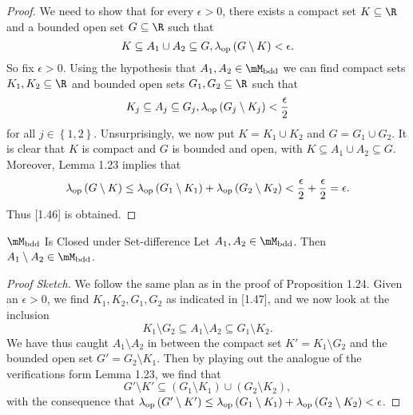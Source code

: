 \documentclass[pmath450]{subfiles}
\begin{document}
    \begin{proof}
        We need to show that for every $\epsilon>0$, there exists a compact set $K\subseteq\R$ and a bounded open set $G\subseteq\R$ such that
        \begin{equation}
            K\subseteq A_1\cup A_2\subseteq G, \lambda_{\operatorname{op}}\left( G\setminus K \right)<\epsilon.
        \end{equation}
        So fix $\epsilon>0$. Using the hypothesis that $A_1,A_2\in\mM_{\bdd}$ we can find compact sets $K_1,K_2\subseteq\R$ and bounded open sets $G_1,G_2\subseteq\R$ such that
        \begin{equation}
            K_j\subseteq A_j\subseteq G_j, \lambda_{\operatorname{op}}\left( G_j\setminus K_j \right)<\frac{\epsilon}{2}
        \end{equation}
        for all $j\in\left\lbrace 1,2 \right\rbrace$. Unsurprisingly, we now put $K=K_1\cup K_2$ and $G=G_1\cup G_2$. It is clear that $K$ is compact and $G$ is bounded and open, with $K\subseteq A_1\cup A_2\subseteq G$. Moreover, Lemma 1.23 implies that
        \begin{equation*}
            \lambda_{\operatorname{op}}\left( G\setminus K \right)\leq\lambda_{\operatorname{op}}\left( G_1\setminus K_1 \right)+\lambda_{\operatorname{op}}\left( G_2\setminus K_2 \right)<\frac{\epsilon}{2}+\frac{\epsilon}{2} = \epsilon.
        \end{equation*}
        Thus [1.46] is obtained.
    \end{proof}

    \begin{prop}{$\mM_{\bdd}$ Is Closed under Set-difference}
        Let $A_1,A_2\in\mM_{\bdd}$. Then $A_1\setminus A_2\in\mM_{\bdd}$.
    \end{prop}

    \begin{proof}[Proof Sketch]
        We follow the same plan as in the proof of Proposition 1.24. Given an $\epsilon>0$, we find $K_1,K_2,G_1,G_2$ as indicated in [1.47], and we now look at the inclusion
        \begin{equation*}
            K_1\setminus G_2\subseteq A_1\setminus A_2\subseteq G_1\setminus K_2.
        \end{equation*}
        We have thus caught $A_1\setminus A_2$ in between the compact set $K'=K_1\setminus G_2$ and the bounded open set $G'=G_2\setminus K_1$. Then by playing out the analogue of the verifications form Lemma 1.23, we find that
        \begin{equation*}
            G'\setminus K'\subseteq\left( G_1\setminus K_1 \right)\cup\left( G_2\setminus K_2 \right),
        \end{equation*}
        with the consequence that $\lambda_{\operatorname{op}}\left( G'\setminus K' \right)\leq\lambda_{\operatorname{op}}\left( G_1\setminus K_1 \right)+\lambda_{\operatorname{op}}\left( G_2\setminus K_2 \right)<\epsilon$.
    \end{proof}
\end{document}
